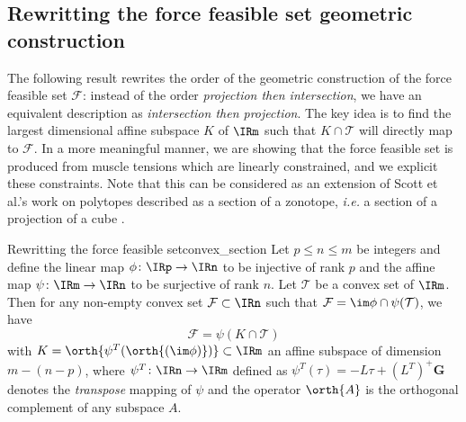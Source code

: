 \subsection{Rewritting the force feasible set geometric construction}
\label{subsec:rewriting_force_feasible_set}
The following result rewrites the order of the geometric construction of the force feasible set $\mathcal{F}$: instead of the order \emph{projection then intersection}, we have an equivalent description as \emph{intersection then projection}. The key idea is to find the largest dimensional affine subspace $K$ of $\IRm$ such that $K\cap \mathcal{T}$ will directly map to $\mathcal{F}$. In a more meaningful manner, we are showing that the force feasible set is produced from muscle tensions which are linearly constrained, and we explicit these constraints. Note that this can be considered as an extension of Scott et al.'s work on polytopes described as a section of a zonotope, \emph{i.e.} a section of a projection of a cube \cite{scottConstrainedZonotopesNew2016}.
\begin{theorembox}{Rewritting the force feasible set}{convex_section}
    Let $p \leq n \leq m$ be integers and define the linear map $\phi\colon \IRp \rightarrow \IRn$ to be injective of rank $p$ and the affine map $\psi\colon \IRm \rightarrow \IRn$ to be surjective of rank $n$.
    Let $\mathcal{T}$ be a convex set of $\IRm$.
    Then for any non-empty convex set $\mathcal{F}\subset\IRn$ such that $\mathcal{F} = \im \phi \cap \psi(\mathcal{T})$, we have 
    $$\mathcal{F} = \psi(K \cap \mathcal{T})$$
    with $K = \orth{\psi^T(\orth{(\im \phi)})}\subset \IRm$ an affine subspace of dimension $m-(n-p)$, where $\psi^T \colon \IRn \rightarrow \IRm$ defined as $\psi^T(\tau) = -L\tau + (L^T)^+\mathbf{G}$ denotes the \emph{transpose} mapping of $\psi$ and the operator $\orth{A}$ is the orthogonal complement of any subspace $A$. 
\end{theorembox}
